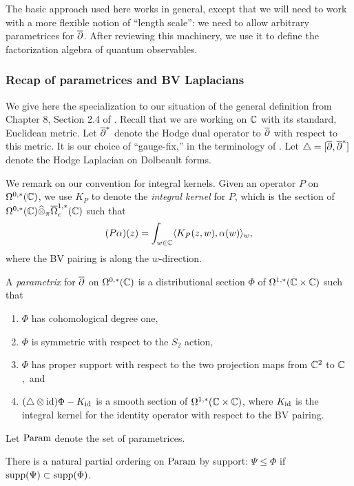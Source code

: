 The basic approach used here works in general, except that we will need to work with a more flexible notion of ``length scale'':
we need to allow arbitrary parametrices for $\overline{\partial}$.
After reviewing this machinery, we use it to define the factorization algebra of quantum observables.

\subsubsection{Recap of parametrices and BV Laplacians}
\label{parametrices}

We give here the specialization to our situation of the general definition from Chapter 8, Section 2.4 of \cite{CG2}.
Recall that we are working on $\mathbb C$ with its standard, Euclidean metric.
Let $\overline{\partial}^*$ denote the Hodge dual operator to $\overline{\partial}$ with respect
to this metric. It is our choice of ``gauge-fix,'' in the terminology of \cite{CosBook}.
Let $\triangle = [\overline{\partial},\overline{\partial}^*]$ denote the Hodge Laplacian on Dolbeault forms.

We remark on our convention for integral kernels.
Given an operator $P$ on $\Omega^{0,*}(\mathbb C)$, 
we use $K_P$ to denote the \emph{integral kernel} for $P$,
which is the section of $\Omega^{0,*}(\mathbb C) \widehat{\otimes}_\pi \overline{\Omega}^{1,*}_c(\mathbb C)$ such that
\[
(P\alpha)(z) = \int_{w \in \mathbb C} \langle K_P(z,w), \alpha(w)\rangle_w,
\]
where the BV pairing is along the $w$-direction.

\begin{dfn}
A {\em parametrix} for $\overline{\partial}$ on $\Omega^{0,*}(\mathbb C)$ is a distributional section $\Phi$ of
$\Omega^{1,*}(\mathbb C \times \mathbb C)$ such that
\begin{enumerate}
\item $\Phi$ has cohomological degree one,
\item $\Phi$ is symmetric with respect to the $S_2$ action,
\item $\Phi$ has proper support with respect to the two projection maps from $\mathbb C^2$ to $\mathbb C$,~and
\item $(\triangle \otimes {\rm id}) \Phi - K_{{\rm id}}$ is a smooth section of $\Omega^{1,*}(\mathbb C \times \mathbb C)$,
where $K_{{\rm id}}$ is the integral kernel for the identity operator with respect to the BV pairing.
\end{enumerate}
Let ${\rm Param}$ denote the set of parametrices.
\end{dfn}

There is a natural partial ordering on ${\rm Param}$ by support:
$\Psi \leq \Phi$ if ${\rm supp}(\Psi) \subset {\rm supp}(\Phi)$.

